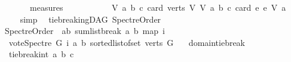 \begin{isabellebody}
\ \ \ \ \ \ \ {\isasymin}\ measures\isanewline
\ \ \ \ \ \ \ \ \ \ \ {\isacharbrackleft}{\kern0pt}{\isasymlambda}{\isacharparenleft}{\kern0pt}V{\isacharcomma}{\kern0pt}\ a{\isacharcomma}{\kern0pt}\ b{\isacharcomma}{\kern0pt}\ c{\isacharparenright}{\kern0pt}{\isachardot}{\kern0pt}\ card\ {\isacharparenleft}{\kern0pt}verts\ V{\isacharparenright}{\kern0pt}{\isacharcomma}{\kern0pt}\ {\isasymlambda}{\isacharparenleft}{\kern0pt}V{\isacharcomma}{\kern0pt}\ a{\isacharcomma}{\kern0pt}\ b{\isacharcomma}{\kern0pt}\ c{\isacharparenright}{\kern0pt}{\isachardot}{\kern0pt}\ card\ {\isacharbraceleft}{\kern0pt}e{\isachardot}{\kern0pt}\ e\ {\isasymrightarrow}\isactrlsup {\isacharasterisk}{\kern0pt}\isactrlbsub V\isactrlesub \ a{\isacharbraceright}{\kern0pt}{\isacharbrackright}{\kern0pt}{\isachardoublequoteclose}\isanewline
\ \ \ \ \isamarkupfalse%
\ simp\isanewline
{}\isamarkupfalse%
%
\endisatagproof
{\isafoldproof}%
%
\isadelimproof
\isanewline
%
\endisadelimproof
\isanewline
{}\isamarkupfalse%
\ {\isacharparenleft}{\kern0pt}\ tie{\isacharunderscore}{\kern0pt}breakingDAG{\isacharparenright}{\kern0pt}\ SpectreOrder{\isacharcolon}{\kern0pt}\isanewline
\ \ {\isachardoublequoteopen}SpectreOrder\ {\isasymequiv}\ {\isacharbraceleft}{\kern0pt}{\isacharparenleft}{\kern0pt}a{\isacharcomma}{\kern0pt}b{\isacharparenright}{\kern0pt}{\isachardot}{\kern0pt}\ sumlist{\isacharunderscore}{\kern0pt}break\ a\ b\ {\isacharparenleft}{\kern0pt}map\ {\isacharparenleft}{\kern0pt}{\isasymlambda}i{\isachardot}{\kern0pt}\isanewline
\ \ \ {\isacharparenleft}{\kern0pt}vote{\isacharunderscore}{\kern0pt}Spectre\ G\ i\ a\ b{\isacharparenright}{\kern0pt}{\isacharparenright}{\kern0pt}\ {\isacharparenleft}{\kern0pt}sorted{\isacharunderscore}{\kern0pt}list{\isacharunderscore}{\kern0pt}of{\isacharunderscore}{\kern0pt}set\ {\isacharparenleft}{\kern0pt}verts\ G{\isacharparenright}{\kern0pt}{\isacharparenright}{\kern0pt}{\isacharparenright}{\kern0pt}\ {\isacharequal}{\kern0pt}\ {}{\isacharbraceright}{\kern0pt}{\isachardoublequoteclose}%
\isadelimdocument
%
\endisadelimdocument
%
\isatagdocument
%
\isamarkuptrue%
%
\endisatagdocument
{\isafolddocument}%
%
\isadelimdocument
%
\endisadelimdocument
{}\isamarkupfalse%
\ domain{\isacharunderscore}{\kern0pt}tie{\isacharunderscore}{\kern0pt}break{\isacharcolon}{\kern0pt}\isanewline
\ \ \ {\isachardoublequoteopen}tie{\isacharunderscore}{\kern0pt}break{\isacharunderscore}{\kern0pt}int\ a\ b\ c\ {\isasymin}\ {\isacharbraceleft}{\kern0pt}{\isacharminus}{\kern0pt}{}\ {\isacharcomma}{\kern0pt}{}\ {\isacharcomma}{\kern0pt}{}{\isacharbraceright}{\kern0pt}{\isachardoublequoteclose}\isanewline

\end{isabellebody}
